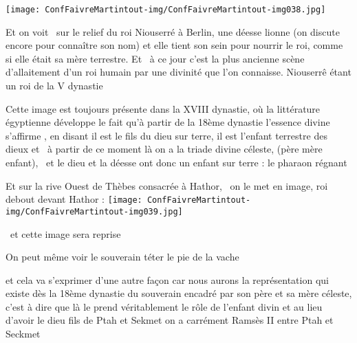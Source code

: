 \documentclass[a4paper]{article}
\begin{document}
\bigskip


\texttt{[image: ConfFaivreMartintout-img/ConfFaivreMartintout-img038.jpg]}



\bigskip

{
Et on voit \ sur le relief du roi Niouserré à Berlin, une déesse lionne
(on discute encore pour connaître son nom) et elle tient son sein pour
nourrir le roi, comme si elle était sa mère terrestre. Et \ à ce jour
c'est la plus ancienne scène d'allaitement d'un roi humain par une
divinité que l'on connaisse. Niouserrê étant un roi de la V dynastie}


\bigskip

{
Cette image est toujours présente dans la XVIII dynastie, où la
littérature égyptienne développe le fait qu'à partir de la 18ème
dynastie l'essence divine s'affirme , en disant {\textquotedbl} il est
le fils du dieu sur terre, il est l'enfant terrestre des dieux et \ à
partir de ce moment là on a la triade divine céleste, (père mère
enfant), \ et le dieu et la déesse ont donc un enfant sur terre : le
pharaon régnant}


\bigskip

{
Et sur la rive Ouest de Thèbes consacrée à Hathor, \ on le met en image,
roi debout devant Hathor :
\texttt{[image: ConfFaivreMartintout-img/ConfFaivreMartintout-img039.jpg]}
}


\bigskip

{
\ et cette image sera reprise}


\bigskip

{
On peut même voir le souverain téter le pie de la vache}


\bigskip


\bigskip


\bigskip


\bigskip


\bigskip


\bigskip


\bigskip


\bigskip


\bigskip


\bigskip


\bigskip


\bigskip

{
et cela va s'exprimer d'une autre façon car nous aurons la
représentation qui existe dès la 18ème dynastie du souverain encadré
par son père et sa mère céleste, c'est à dire que là le prend
véritablement le rôle de l'enfant divin et au lieu d'avoir le dieu fils
de Ptah et Sekmet on a carrément Ramsès II entre Ptah et Seckmet}
\end{document}
